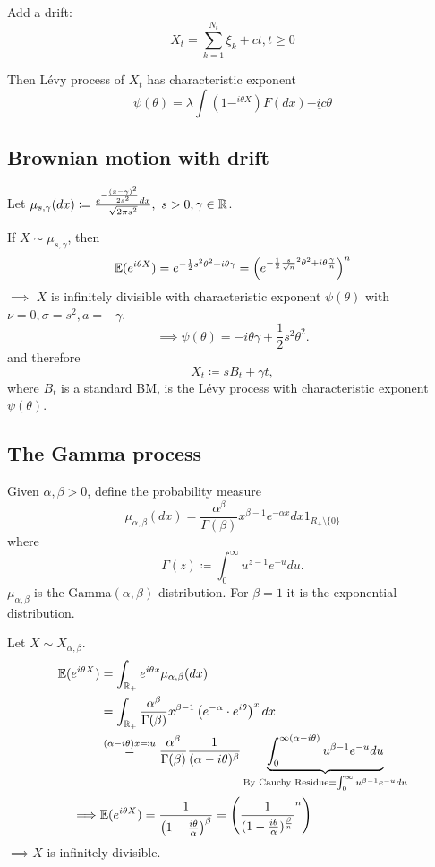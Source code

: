 Add a drift: 
\[X_t=\sum_{k=1}^{N_t}\xi_k+ct,t\geq 0\]

Then Lévy process of $X_t$ has characteristic exponent 
\[\psi(\theta)=\lambda\int (1-^{i\theta X})F(dx)\underline{-ic\theta}\]

\subsection{Brownian motion with drift}

Let $\mu_{s,\gamma}(dx)\coloneqq \frac{e^{-\frac{(x-\gamma)^2}{2s^2}}dx}{\sqrt{2\pi s^2}}, \text{ } s>0,\gamma\in\mathbb{R}$.

If $X\sim \mu_{s,\gamma}$, then 
\[\mathbb{E}(e^{i\theta X})=e^{-\frac{1}{2}s^2\theta^2+i\theta \gamma}=\left(e^{-\frac{1}{2}\frac{s}{\sqrt{n}}^2\theta^2+i\theta \frac{\gamma}{n}}\right)^n\]
$\implies$ $X$ is infinitely divisible with characteristic exponent $\psi(\theta)$ with 
$\nu=0,\sigma=s^2,a=-\gamma$.
\[\implies \psi(\theta)=-i\theta\gamma +\frac{1}{2}s^2\theta^2.\]
and therefore \[X_t\coloneqq s B_t+\gamma t,\]
where $B_t$ is a standard BM, is the Lévy process with characteristic exponent $\psi(\theta)$.


\subsection{The Gamma process}


Given $\alpha,\beta>0$, define the probability measure 
\[\mu_{\alpha,\beta}(dx)=\frac{\alpha^\beta}{\Gamma(\beta)}x^{\beta-1}e^{-\alpha x}dx 1_{R_+\setminus\{0\}}\]
where \[\Gamma(z)\coloneqq \int_0^\infty u^{z-1}e^{-u}du.\]
$\mu_{\alpha,\beta}$ is the Gamma$(\alpha,\beta)$ distribution. For $\beta=1$ it is the exponential distribution.

Let $X\sim X_{\alpha,\beta}$.\begin{align*}
    \mathbb{E}(e^{i\theta X})&=\int_{\mathbb{R}_+} e^{i\theta x}\mu_{\alpha,\beta}(dx)\\
    &=\int_{\mathbb{R}_+} \frac{\alpha^\beta}{\Gamma(\beta)}x^{\beta-1}\left(e^{-\alpha}\cdot e^{i\theta} \right)^xdx \\
    &\stackrel{(\alpha-i\theta )x \eqqcolon u}{=}\frac{\alpha^\beta}{\Gamma(\beta)}\frac{1}{(\alpha-i\theta)^\beta}\underbrace{\int_0^{\infty(\alpha-i\theta)}u^{\beta-1} e^{-u}du}_{\text{By Cauchy Residue}=\int_0^\infty u^{\beta-1}e^{-u}du}\\
    \implies&\mathbb{E}(e^{i\theta X})=\frac{1}{\left(1-\frac{i\theta}{\alpha}\right)^\beta}=\left(\frac{1}{(1-\frac{i\theta}{\alpha})^{\frac{\beta}{n}}}^{n}\right)
\end{align*}
$\implies X$ is infinitely divisible. 

